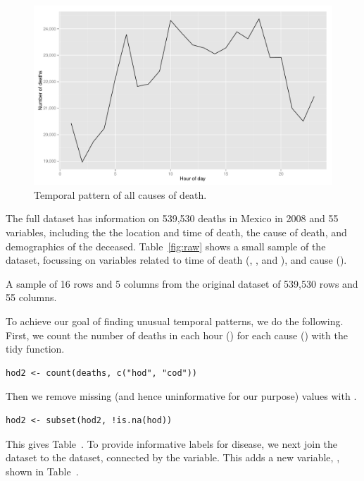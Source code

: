 \documentclass[article]{jss}
\begin{document}
\begin{figure}[htbp]
  \centering
  \includegraphics[width=0.65\linewidth]{case-study/overall}
  \caption{Temporal pattern of all causes of death.}
  \label{fig:overall}
\end{figure}

The full dataset has information on 539,530 deaths in Mexico in 2008 and 55 variables, including the the location and time of death, the cause of death, and demographics of the deceased. Table~\ref{fig:raw} shows a small sample of the dataset, focussing on variables related to time of death (, ,  and ), and cause ().

\begin{table}
  \centering
  
  \caption{A sample of 16 rows and 5 columns from the original dataset of 539,530 rows and 55 columns.}
  \label{fig:raw}
\end{table}

To achieve our goal of finding unusual temporal patterns, we do the following. First, we count the number of deaths in each hour () for each cause () with the tidy  function. 

\begin{Verbatim}
hod2 <- count(deaths, c("hod", "cod"))
\end{Verbatim}

Then we remove missing (and hence uninformative for our purpose) values with . 

\begin{Verbatim}
hod2 <- subset(hod2, !is.na(hod))
\end{Verbatim}

This gives Table~. To provide informative labels for disease, we next join the dataset to the  dataset, connected by the  variable. This adds a new variable, , shown in Table~.
\end{document}

